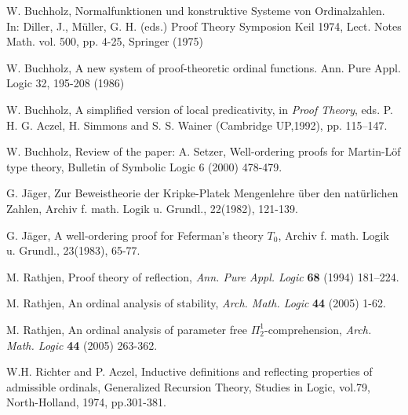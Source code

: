 \documentclass{article}
\begin{document}
\begin{thebibliography}{99}
W. Buchholz, 
Normalfunktionen und konstruktive Systeme von Ordinalzahlen.
In: Diller, J., M\"uller, G. H. (eds.)
Proof Theory Symposion Keil 1974, Lect. Notes Math. vol. 500, pp. 4-25, Springer (1975)

W. Buchholz, 
A new system of proof-theoretic ordinal functions.
Ann. Pure Appl. Logic 32, 195-208 (1986)

 W. Buchholz, 
A simplified version of local predicativity, 
in \textit{Proof Theory},
eds. P. H. G. Aczel, H. Simmons and S. S. Wainer
(Cambridge UP,1992), pp. 115--147.

W. Buchholz, Review of the paper: A. Setzer, Well-ordering proofs for Martin-L\"of type theory, Bulletin of Symbolic Logic 6 (2000) 478-479.




G. J\"ager, Zur Beweistheorie der Kripke-Platek Mengenlehre \"uber den nat\"urlichen Zahlen, 
Archiv f. math. Logik u. Grundl., 22(1982), 121-139.

G. J\"ager, 
A well-ordering proof for Feferman's theory $T_{0}$, 
Archiv f. math. Logik u. Grundl., 23(1983), 65-77.


M. Rathjen, 
Proof theory of reflection, 
\textit{Ann. Pure Appl. Logic} \textbf{68} (1994) 181--224.

M. Rathjen, 
An ordinal analysis of stability, 
\textit{Arch. Math. Logic} {\bf 44} (2005) 1-62.

M. Rathjen, 
An ordinal analysis of parameter free $\Pi^{1}_{2}$-comprehension,
\textit{Arch. Math. Logic} \textbf{44} (2005) 263-362.


 W.H. Richter and  P. Aczel, Inductive definitions and reflecting properties of admissible ordinals, Generalized Recursion Theory, Studies in Logic, vol.79, North-Holland, 1974, pp.301-381.


\end{thebibliography}
\end{document}
